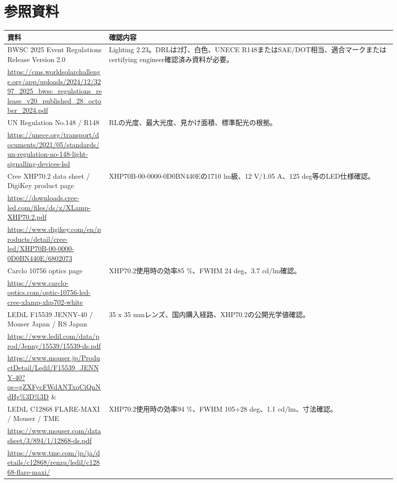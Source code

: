\documentclass[11pt,a4paper]{article}
\begin{document}
\section{参照資料}
\begin{longtable}{p{0.24\linewidth}p{0.68\linewidth}}
\toprule
資料 & 確認内容\\
\midrule
BWSC 2025 Event Regulations Release Version 2.0 &
Lighting 2.23。DRLは2灯、白色、UNECE R148またはSAE/DOT相当、適合マークまたはcertifying engineer確認済み資料が必要。\\
\url{https://cms.worldsolarchallenge.org/app/uploads/2024/12/3297_2025_bwsc_regulations_release_v20_published_28_october_2024.pdf} & \\
\addlinespace
UN Regulation No.148 / R148 &
RLの光度、最大光度、見かけ面積、標準配光の根拠。\\
\url{https://unece.org/transport/documents/2021/05/standards/un-regulation-no-148-light-signalling-devices-lsd} & \\
\addlinespace
Cree XHP70.2 data sheet / DigiKey product page &
XHP70B-00-0000-0D0BN440Eの1710 lm級、12 V/1.05 A、125 deg等のLED仕様確認。\\
\url{https://downloads.cree-led.com/files/ds/x/XLamp-XHP70.2.pdf} & \\
\url{https://www.digikey.com/en/products/detail/cree-led/XHP70B-00-0000-0D0BN440E/6802073} & \\
\addlinespace
Carclo 10756 optics page &
XHP70.2使用時の効率85 \%、FWHM 24 deg、3.7 cd/lm確認。\\
\url{https://www.carclo-optics.com/optic-10756-led-cree-xlamp-xhp702-white} & \\
\addlinespace
LEDiL F15539 JENNY-40 / Mouser Japan / RS Japan &
35 x 35 mmレンズ、国内購入経路、XHP70.2の公開光学値確認。\\
\url{https://www.ledil.com/data/prod/Jenny/15539/15539-ds.pdf} & \\
\url{https://www.mouser.jp/ProductDetail/Ledil/F15539_JENNY-40?qs=gZXFycFWdANTxqCiQnNdHg%3D%3D} & \\
\url{https://jp.rs-online.com/web/p/led-lenses-reflectors/2066680} & \\
\addlinespace
LEDiL C12868 FLARE-MAXI / Mouser / TME &
XHP70.2使用時の効率94 \%、FWHM 105+28 deg、1.1 cd/lm、寸法確認。\\
\url{https://www.mouser.com/datasheet/3/894/1/12868-ds.pdf} & \\
\url{https://www.tme.com/jp/ja/details/c12868/renzu/ledil/c12868-flare-maxi/} & \\
\bottomrule
\end{longtable}
\end{document}
